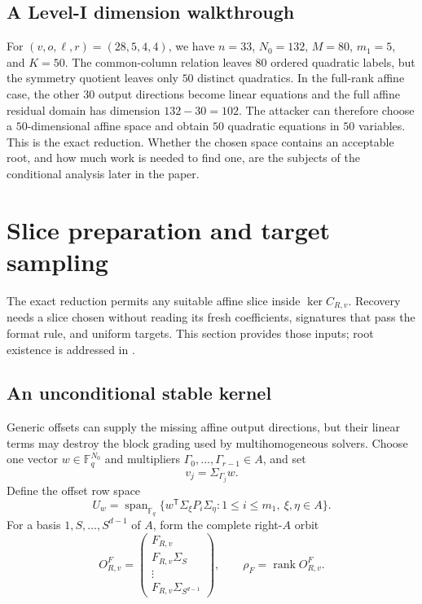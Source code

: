 \documentclass[11pt]{article}
\newcommand{\F}{\mathbb F}
\newcommand{\rank}{\operatorname{rank}}
\newcommand{\Span}{\operatorname{span}}
\newcommand{\transpose}{\mathsf T}
\begin{document}
\subsection{A Level-I dimension walkthrough}
For $(v,o,\ell,r)=(28,5,4,4)$, we have $n=33$, $N_0=132$, $M=80$,
$m_1=5$, and $K=50$.  The common-column relation leaves $80$ ordered
quadratic labels, but the symmetry quotient leaves only $50$ distinct
quadratics.  In the full-rank affine case, the other $30$ output directions
become linear equations and the full affine residual domain has dimension
$132-30=102$.  The attacker can therefore choose a $50$-dimensional affine
space and obtain $50$ quadratic equations in $50$ variables.  This is the
exact reduction.  Whether the chosen space contains an acceptable root, and
how much work is needed to find one, are the subjects of the conditional
analysis later in the paper.

\section{Slice preparation and target sampling}
\label{sec:stable-rejection}
\label{sec:sq-preparing}

The exact reduction permits any suitable affine slice inside
$\ker C_{R,v}$.  Recovery needs a slice chosen without reading its fresh
coefficients, signatures that pass the format rule, and uniform targets.  This
section provides those inputs; root existence is addressed in
.

\subsection{An unconditional stable kernel}
Generic offsets can supply the missing affine output directions, but their
linear terms may destroy the block grading used by multihomogeneous solvers.
Choose one vector $w\in\F_q^{N_0}$ and multipliers
$\Gamma_0,\ldots,\Gamma_{r-1}\in A$, and set
\begin{equation}
  v_j=\Sigma_{\Gamma_j}w.                            \label{eq:structured-offsets}
\end{equation}
Define the offset row space
\begin{equation}
 U_w=\Span_{\F_q}\{w^\transpose\Sigma_\xi P_i\Sigma_\eta:
     1\le i\le m_1,\ \xi,\eta\in A\}.              \label{eq:Uw}
\end{equation}
For a basis $1,S,\ldots,S^{d-1}$ of $A$, form the complete right-$A$ orbit
\begin{equation}
 O^F_{R,v}=
 \begin{pmatrix}
  F_{R,v}\\F_{R,v}\Sigma_S\\\vdots\\F_{R,v}\Sigma_{S^{d-1}}
 \end{pmatrix},
 \qquad \rho_F=\rank O^F_{R,v}.                    \label{eq:orbit-matrix}
\end{equation}
\end{document}
